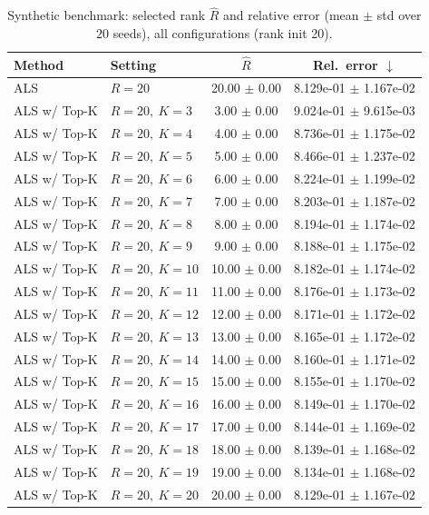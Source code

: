 \begin{table}[t]
\centering
\caption{Synthetic benchmark: selected rank \(\hat R\) and relative error (mean \(\pm\) std over \(20\) seeds), all configurations (rank init 20).}
\label{tab:results_synth_all}
\begin{tabular}{@{}llcc@{}}
\toprule
Method & Setting & \(\hat R\) & Rel.\ error \(\downarrow\) \\ \midrule
ALS & \(R=20\) & 20.00 $\pm$ 0.00 & 8.129e-01 $\pm$ 1.167e-02 \\
ALS w/ Top-K & \(R=20,\ K=3\) & 3.00 $\pm$ 0.00 & 9.024e-01 $\pm$ 9.615e-03 \\
ALS w/ Top-K & \(R=20,\ K=4\) & 4.00 $\pm$ 0.00 & 8.736e-01 $\pm$ 1.175e-02 \\
ALS w/ Top-K & \(R=20,\ K=5\) & 5.00 $\pm$ 0.00 & 8.466e-01 $\pm$ 1.237e-02 \\
ALS w/ Top-K & \(R=20,\ K=6\) & 6.00 $\pm$ 0.00 & 8.224e-01 $\pm$ 1.199e-02 \\
ALS w/ Top-K & \(R=20,\ K=7\) & 7.00 $\pm$ 0.00 & 8.203e-01 $\pm$ 1.187e-02 \\
ALS w/ Top-K & \(R=20,\ K=8\) & 8.00 $\pm$ 0.00 & 8.194e-01 $\pm$ 1.174e-02 \\
ALS w/ Top-K & \(R=20,\ K=9\) & 9.00 $\pm$ 0.00 & 8.188e-01 $\pm$ 1.175e-02 \\
ALS w/ Top-K & \(R=20,\ K=10\) & 10.00 $\pm$ 0.00 & 8.182e-01 $\pm$ 1.174e-02 \\
ALS w/ Top-K & \(R=20,\ K=11\) & 11.00 $\pm$ 0.00 & 8.176e-01 $\pm$ 1.173e-02 \\
ALS w/ Top-K & \(R=20,\ K=12\) & 12.00 $\pm$ 0.00 & 8.171e-01 $\pm$ 1.172e-02 \\
ALS w/ Top-K & \(R=20,\ K=13\) & 13.00 $\pm$ 0.00 & 8.165e-01 $\pm$ 1.172e-02 \\
ALS w/ Top-K & \(R=20,\ K=14\) & 14.00 $\pm$ 0.00 & 8.160e-01 $\pm$ 1.171e-02 \\
ALS w/ Top-K & \(R=20,\ K=15\) & 15.00 $\pm$ 0.00 & 8.155e-01 $\pm$ 1.170e-02 \\
ALS w/ Top-K & \(R=20,\ K=16\) & 16.00 $\pm$ 0.00 & 8.149e-01 $\pm$ 1.170e-02 \\
ALS w/ Top-K & \(R=20,\ K=17\) & 17.00 $\pm$ 0.00 & 8.144e-01 $\pm$ 1.169e-02 \\
ALS w/ Top-K & \(R=20,\ K=18\) & 18.00 $\pm$ 0.00 & 8.139e-01 $\pm$ 1.168e-02 \\
ALS w/ Top-K & \(R=20,\ K=19\) & 19.00 $\pm$ 0.00 & 8.134e-01 $\pm$ 1.168e-02 \\
ALS w/ Top-K & \(R=20,\ K=20\) & 20.00 $\pm$ 0.00 & 8.129e-01 $\pm$ 1.167e-02 \\

\end{tabular}
\end{table}
